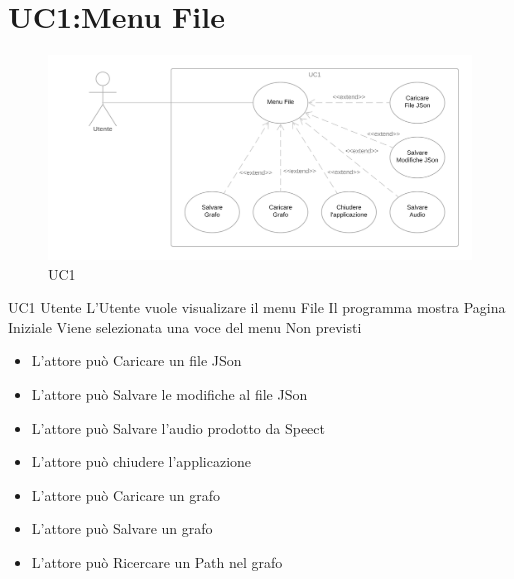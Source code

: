 \documentclass[../AnalisideiRequisiti.tex]{subfiles}
\begin{document}
	\section{UC1:Menu File}
	\begin{figure}[htp]
		\caption{UC1}
		\centering
		\includegraphics[width=\textwidth]{../img/UC01.png}
	\end{figure}
	\UserCase
	{UC1}
	{Utente}
	{}
	{L'Utente vuole visualizare il menu File}
	{Il programma mostra Pagina Iniziale }
	{Viene selezionata una voce del menu}
	{Non previsti}
	{	\begin{itemize}
		\item{} L'attore può Caricare un file JSon 
		\item{} L'attore può Salvare le modifiche al file JSon 
		\item{} L'attore può Salvare l'audio prodotto da Speect 
		\item{} L'attore può chiudere l'applicazione 
		\item{} L'attore può Caricare un grafo 
		\item{} L'attore può Salvare un grafo 
		\item{} L'attore può Ricercare un Path nel grafo 
		\end{itemize}
	}
\end{document}
